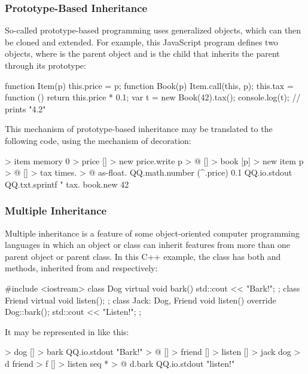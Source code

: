 \documentclass[sigplan,nonacm]{acmart}
\begin{document}
\subsubsection{Prototype-Based Inheritance}

So-called prototype-based programming uses generalized objects, which can then be cloned and extended. For example, this JavaScript program defines two objects, where  is the parent object and  is the child that inherits the parent through its prototype:

\begin{ffcode}
function Item(p) { this.price = p; }
function Book(p) {
  Item.call(this, p);
  this.tax = function () {
    return this.price * 0.1;
  }
}
var t = new Book(42).tax();
console.log(t); // prints "4.2"
\end{ffcode}

This mechanism of prototype-based inheritance may be translated to the following \eolang{} code, using the mechanism of decoration:

\begin{ffcode}
[p] > item
  memory 0 > price
  [] > new
    price.write p > @
[] > book
  [p] > new
    item p > @
    [] > tax
      times. > @
        as-float.
          QQ.math.number (^.price)
        0.1
QQ.io.stdout
  QQ.txt.sprintf
    "%
    tax.
      book.new 42
\end{ffcode}

\subsubsection{Multiple Inheritance}

Multiple inheritance is a feature of some object-oriented computer programming languages in which an object or class can inherit features from more than one parent object or parent class. In this C++ example,
the class  has both  and  methods, inherited from  and  respectively:

\begin{ffcode}
#include <iostream>
class Dog {
  virtual void bark() {
    std::cout << "Bark!";
  }
};
class Friend {
  virtual void listen();
};
class Jack: Dog, Friend {
  void listen() override {
    Dog::bark();
    std::cout << "Listen!";
  }
};
\end{ffcode}

It may be represented in \eolang{} like this:

\begin{ffcode}
[] > dog
  [] > bark
    QQ.io.stdout "Bark!" > @
[] > friend
  [] > listen
[] > jack
  dog > d
  friend > f
  [] > listen
    seq * > @
      d.bark
      QQ.io.stdout "listen!"
\end{ffcode}
\end{document}
